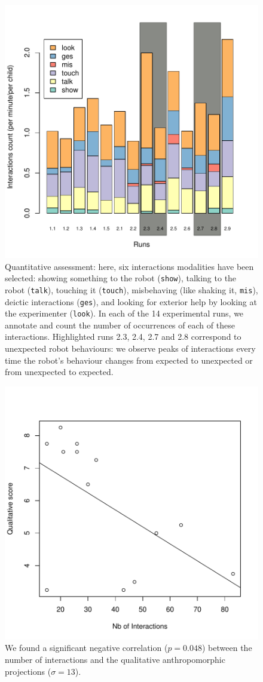 \documentclass{frontiersSCNS} %
\begin{document}
\begin{figure}
    \centering
    \includegraphics[width=0.6\columnwidth]{ranger-interactions-per-runs}
    \caption{Quantitative assessment: here, six interactions modalities have
        been selected: showing something to the robot ({\tt show}), talking to
        the robot ({\tt talk}), touching it ({\tt touch}), misbehaving (like
        shaking it, {\tt mis}), deictic interactions ({\tt ges}), and looking
        for exterior help by looking at the experimenter ({\tt look}). In each
        of the 14 experimental runs, we annotate and count the number of
        occurrences of each of these interactions.  Highlighted runs 2.3, 2.4,
        2.7 and 2.8 correspond to unexpected robot behaviours: we observe peaks
        of interactions every time the robot's behaviour changes from expected to
        unexpected or from unexpected to expected.}

    \label{interactions-per-run}
\end{figure}


\begin{figure}
    \centering
    \includegraphics[width=0.6\columnwidth]{ranger-interactions-vs-qualitative-score}
    \caption{We found a significant negative correlation ($p=0.048$) between the
    number of interactions and the qualitative anthropomorphic projections
    ($\sigma=13$).}
    \label{qualitative-score}
\end{figure}
\end{document}

